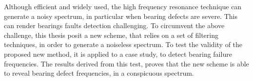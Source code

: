 \documentclass[../Main/thesis.tex]{subfiles}
\begin{document}
 \justify
 Although efficient and widely used, the high frequency resonance technique can generate a noisy spectrum, in particular when bearing defects are severe. This can render bearings faults detection challenging. To circumvent the above challenge, this thesis posit a new scheme, that relies on a set of filtering techniques, in order to generate a noiseless spectrum. To test the validity of the proposed new method, it is applied to a case study, to detect bearing failure frequencies. The results derived from this test, proves that the new scheme is able to reveal bearing defect frequencies, in a conspicuous spectrum.


\vfill\vfill
\clearpage
\blankpage
\end{document}
